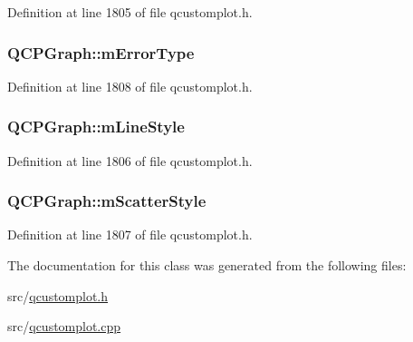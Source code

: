 Definition at line 1805 of file qcustomplot.\-h.

\hypertarget{class_q_c_p_graph_a29e64273db201aeadebc61c870720a36}{
\subsubsection[{m\-Error\-Type}]{ Q\-C\-P\-Graph\-::m\-Error\-Type\hspace{0.3cm}{\ttfamily [protected]}}}\label{class_q_c_p_graph_a29e64273db201aeadebc61c870720a36}


Definition at line 1808 of file qcustomplot.\-h.

\hypertarget{class_q_c_p_graph_a8604fd98402035a63375849f7341ee25}{
\subsubsection[{m\-Line\-Style}]{ Q\-C\-P\-Graph\-::m\-Line\-Style\hspace{0.3cm}{\ttfamily [protected]}}}\label{class_q_c_p_graph_a8604fd98402035a63375849f7341ee25}


Definition at line 1806 of file qcustomplot.\-h.

\hypertarget{class_q_c_p_graph_a4aa36241f166ccd1f75fc8f24e4a3247}{
\subsubsection[{m\-Scatter\-Style}]{ Q\-C\-P\-Graph\-::m\-Scatter\-Style\hspace{0.3cm}{\ttfamily [protected]}}}\label{class_q_c_p_graph_a4aa36241f166ccd1f75fc8f24e4a3247}


Definition at line 1807 of file qcustomplot.\-h.



The documentation for this class was generated from the following files\-:\begin{DoxyCompactItemize}
\item 
src/\hyperlink{qcustomplot_8h}{qcustomplot.\-h}\item 
src/\hyperlink{qcustomplot_8cpp}{qcustomplot.\-cpp}\end{DoxyCompactItemize}
